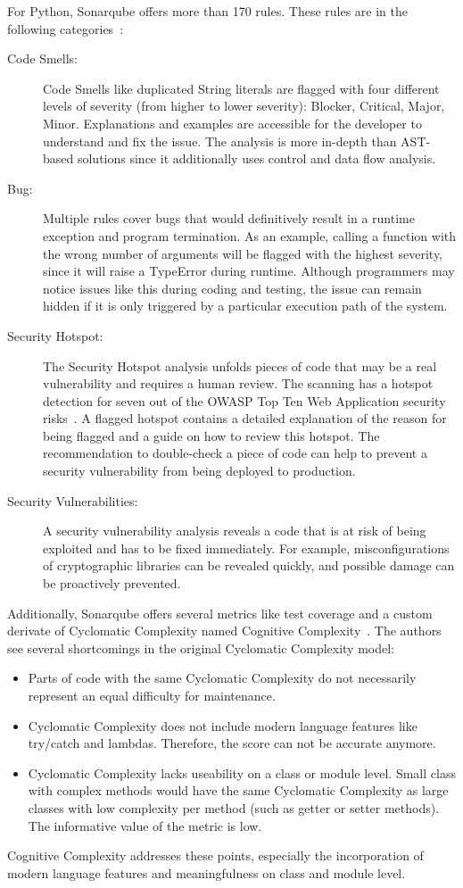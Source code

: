 For Python, Sonarqube offers more than 170 rules. These rules are in the following categories~\cite{noauthor_python_nodate}:
\begin{description}
    \item[Code Smells:] Code Smells like duplicated String literals are flagged with four different levels of severity (from higher to lower severity): Blocker, Critical, Major, Minor. Explanations and examples are accessible for the developer to understand and fix the issue. The analysis is more in-depth than AST-based solutions since it additionally uses control and data flow analysis.
    \item[Bug:] Multiple rules cover bugs that would definitively result in a runtime exception and program termination. As an example, calling a function with the wrong number of arguments will be flagged with the highest severity, since it will raise a TypeError during runtime. Although programmers may notice issues like this during coding and testing, the issue can remain hidden if it is only triggered by a particular execution path of the system.
     \item[Security Hotspot:] The Security Hotspot analysis unfolds pieces of code that may be a real vulnerability and requires a human review. The scanning has a hotspot detection for seven out of the OWASP Top Ten Web Application security risks~\cite{noauthor_python_nodate}. A flagged hotspot contains a detailed explanation of the reason for being flagged and a guide on how to review this hotspot. The recommendation to double-check a piece of code can help to prevent a security vulnerability from being deployed to production.
    \item[Security Vulnerabilities:]  A security vulnerability analysis reveals a code that is at risk of being exploited and has to be fixed immediately. For example, misconfigurations of cryptographic libraries can be revealed quickly, and possible damage can be proactively prevented.   
\end{description}

Additionally, Sonarqube offers several metrics like test coverage and a custom derivate of Cyclomatic Complexity named Cognitive Complexity~\cite{campbell2018cognitive}. The authors see several shortcomings in the original Cyclomatic Complexity model:
\begin{itemize}
    \item Parts of code with the same Cyclomatic Complexity do not necessarily represent an equal difficulty for maintenance.
    \item  Cyclomatic Complexity does not include modern language features like try/catch and lambdas. Therefore, the score can not be accurate anymore.
    \item Cyclomatic Complexity lacks useability on a class or module level. Small class with complex methods would have the same Cyclomatic Complexity as large classes with low complexity per method (such as getter or setter methods). The informative value of the metric is low.
\end{itemize}
Cognitive Complexity addresses these points, especially the incorporation of modern language features and meaningfulness on class and module level.

